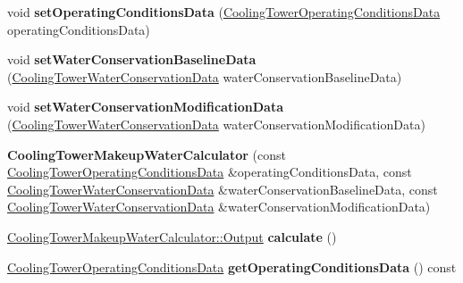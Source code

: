 \begin{DoxyCompactItemize}
void {\bfseries set\+Operating\+Conditions\+Data} (\hyperlink{class_cooling_tower_operating_conditions_data}{Cooling\+Tower\+Operating\+Conditions\+Data} operating\+Conditions\+Data)
\item 
\mbox{\label{class_cooling_tower_makeup_water_calculator_aad6f9b1a892dd62a95840dc18e1be48a}} 
void {\bfseries set\+Water\+Conservation\+Baseline\+Data} (\hyperlink{class_cooling_tower_water_conservation_data}{Cooling\+Tower\+Water\+Conservation\+Data} water\+Conservation\+Baseline\+Data)
\item 
\mbox{\label{class_cooling_tower_makeup_water_calculator_a3197dc0cd103c582e4b00fdf5790583a}} 
void {\bfseries set\+Water\+Conservation\+Modification\+Data} (\hyperlink{class_cooling_tower_water_conservation_data}{Cooling\+Tower\+Water\+Conservation\+Data} water\+Conservation\+Modification\+Data)
\item 
\mbox{\label{class_cooling_tower_makeup_water_calculator_a5b2e764931ef302ba3bd8bbde7775187}} 
{\bfseries Cooling\+Tower\+Makeup\+Water\+Calculator} (const \hyperlink{class_cooling_tower_operating_conditions_data}{Cooling\+Tower\+Operating\+Conditions\+Data} \&operating\+Conditions\+Data, const \hyperlink{class_cooling_tower_water_conservation_data}{Cooling\+Tower\+Water\+Conservation\+Data} \&water\+Conservation\+Baseline\+Data, const \hyperlink{class_cooling_tower_water_conservation_data}{Cooling\+Tower\+Water\+Conservation\+Data} \&water\+Conservation\+Modification\+Data)
\item 
\mbox{\label{class_cooling_tower_makeup_water_calculator_a13eda6b87d0ddbd49289b887c123e5b2}} 
\hyperlink{struct_cooling_tower_makeup_water_calculator_1_1_output}{Cooling\+Tower\+Makeup\+Water\+Calculator\+::\+Output} {\bfseries calculate} ()
\item 
\mbox{\label{class_cooling_tower_makeup_water_calculator_a6c64b1067a7ea2415f15313bcbc8188b}} 
\hyperlink{class_cooling_tower_operating_conditions_data}{Cooling\+Tower\+Operating\+Conditions\+Data} {\bfseries get\+Operating\+Conditions\+Data} () const
\item 
\mbox{\label{class_cooling_tower_makeup_water_calculator_ac130abbb8ec8f5b17a2b3696482b1a66}} 

\end{DoxyCompactItemize}
